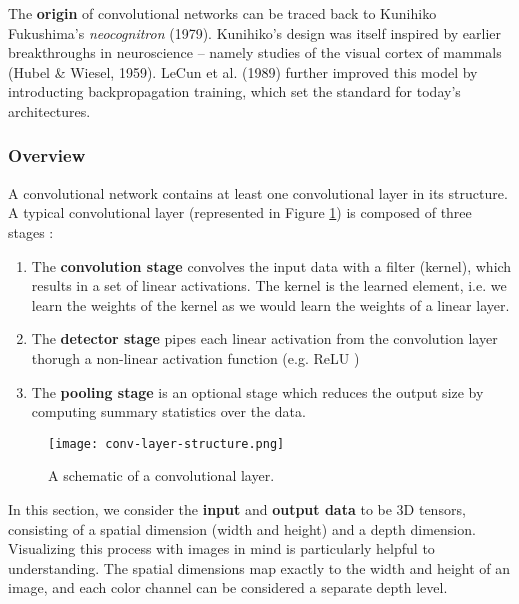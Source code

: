 The \textbf{origin} of convolutional networks can be traced back to Kunihiko Fukushima's \emph{neocognitron} (1979).
Kunihiko’s design \cite{neocognitron-paper} was itself inspired by earlier breakthroughs in neuroscience -- namely studies of the visual cortex of mammals (Hubel \& Wiesel, 1959).
LeCun et al. (1989) further improved this model by introducting backpropagation training, which set the standard for today’s architectures.

\subsubsection{Overview}
A convolutional network contains at least one convolutional layer in its structure.
A typical convolutional layer (represented in Figure \ref{fig:conv-layer}) is composed of three stages \cite{Goodfellow-et-al-2016}:
\begin{enumerate}
    \item The \textbf{convolution stage} convolves the input data with a filter (kernel), which results in a set of linear activations.
    The kernel is the learned element, i.e. we learn the weights of the kernel as we would learn the weights of a linear layer.
    \item The \textbf{detector stage} pipes each linear activation from the convolution layer thorugh a non-linear activation function (e.g. ReLU \footnotemark)
    \item The \textbf{pooling stage} is an optional stage which reduces the output size by computing summary statistics over the data.
\end{enumerate}

\begin{figure}[h]
    \centering
    \texttt{[image: conv-layer-structure.png]}
    \caption{A schematic of a convolutional layer.}
    \label{fig:conv-layer}
\end{figure}

In this section, we consider the \textbf{input} and \textbf{output data} to be 3D tensors, consisting of a spatial dimension (width and height) and a depth dimension.
Visualizing this process with images in mind is particularly helpful to understanding.
The spatial dimensions map exactly to the width and height of an image, and each color channel can be considered a separate depth level.


